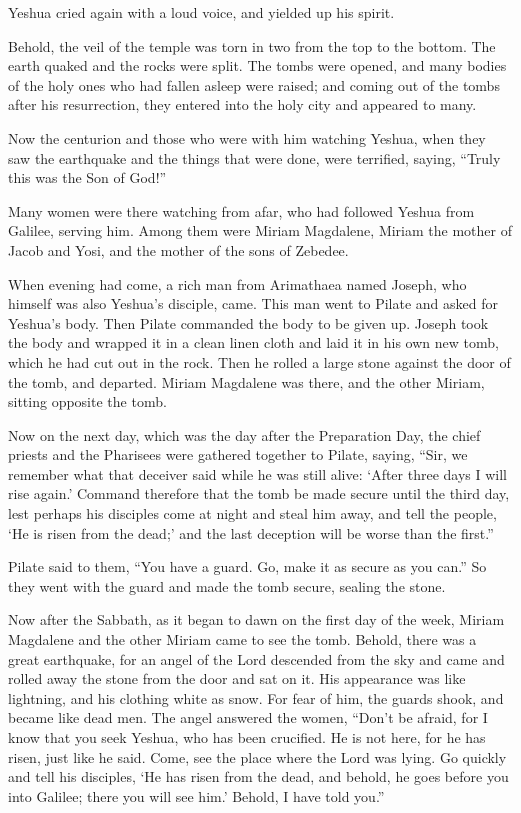 \myverse{}Yeshua cried again with a loud voice, and yielded up his spirit.

\myverse{}Behold, the veil of the temple was torn in two from the top
to the bottom. The earth quaked and the rocks were split.
\myverse{}The tombs were opened, and many bodies of the holy ones who had fallen asleep
were raised;
\myverse{}and coming out of the tombs after his resurrection, they entered into the
holy city and appeared to many.

\myverse{}Now the centurion and those who were with him watching Yeshua,
when they saw the earthquake and the things that were done, were terrified, saying, “Truly this was the
Son of God!”

\myverse{}Many women were there watching from afar, who had followed Yeshua
from Galilee, serving him.
\myverse{}Among them were Miriam Magdalene, Miriam the mother of Jacob and Yosi, and
the mother of the sons of Zebedee.

\myverse{}When evening had come, a rich man from Arimathaea named Joseph,
who himself was also Yeshua’s disciple, came.
\myverse{}This man went to Pilate and asked for Yeshua’s body. Then Pilate commanded
the body to be given up.
\myverse{}Joseph took the body and wrapped it in a clean linen cloth
\myverse{}and laid it in his own new tomb, which he had cut out in the rock. Then he
rolled a large stone against the door of the tomb, and departed.
\myverse{}Miriam Magdalene was there, and the other Miriam, sitting opposite the tomb.

\myverse{}Now on the next day, which was the day after the Preparation
Day, the chief priests and the Pharisees were gathered together to Pilate,
\myverse{}saying, “Sir, we remember what that deceiver said while he was still alive:
‘After three days I will rise again.’
\myverse{}Command therefore that the tomb be made secure until the third day, lest
perhaps his disciples come at night and steal him away, and tell the people, ‘He is risen from the dead;’
and the last deception will be worse than the first.”

\myverse{}Pilate said to them, “You have a guard. Go, make it as secure
as you can.”
\myverse{}So they went with the guard and made the tomb secure, sealing the stone.


\mychapter{} \myverse*{}Now after the Sabbath, as it began to dawn on the first day of
the week, Miriam Magdalene and the other Miriam came to see the tomb.
\myverse{}Behold, there was a great earthquake, for an angel of the Lord descended from
the sky and came and rolled away the stone from the door and sat on it.
\myverse{}His appearance was like lightning, and his clothing white as snow.
\myverse{}For fear of him, the guards shook, and became like dead men.
\myverse{}The angel answered the women, “Don’t be afraid, for I know that you seek Yeshua,
who has been crucified.
\myverse{}He is not here, for he has risen, just like he said. Come, see the place where
the Lord was lying.
\myverse{}Go quickly and tell his disciples, ‘He has risen from the dead, and behold,
he goes before you into Galilee; there you will see him.’ Behold, I have told you.”

